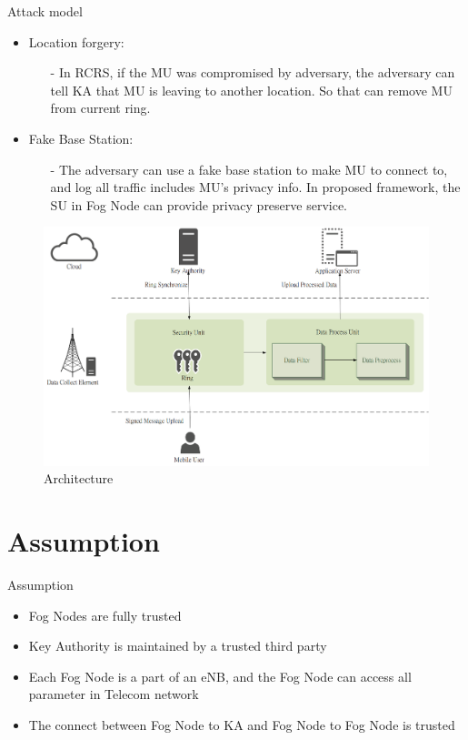 \documentclass{beamer}
\begin{document}
\begin{frame}{Attack model}
    \begin{itemize}
        \item {Location forgery:}
        \begin{itemize}
            \item[-] In RCRS, if the MU was compromised by adversary, the adversary can tell KA that MU is leaving to another location. So that can remove MU from current ring.
        \end{itemize}
        \item {Fake Base Station:}
        \begin{itemize}
            \item[-] The adversary can use a fake base station to make MU to connect to, and log all traffic includes MU's privacy info. In proposed framework, the SU in Fog Node can provide privacy preserve service.
        \end{itemize}
    \end{itemize}
\end{frame}
\begin{frame}{}
    \begin{figure}[t]
        \centering
        \includegraphics[width=1.0\textwidth]{figures/1.png}
        \caption{Architecture}
    \end{figure}
\end{frame}
\section{Assumption}
\begin{frame}{Assumption}
    \begin{itemize}
        \item {Fog Nodes are fully trusted}
        \item {Key Authority is maintained by a trusted third party}
        \item {Each Fog Node is a part of an eNB, and the Fog Node can access all parameter in Telecom network}
        \item {The connect between Fog Node to KA and Fog Node to Fog Node is trusted}
    \end{itemize}
\end{frame}
\end{document}
